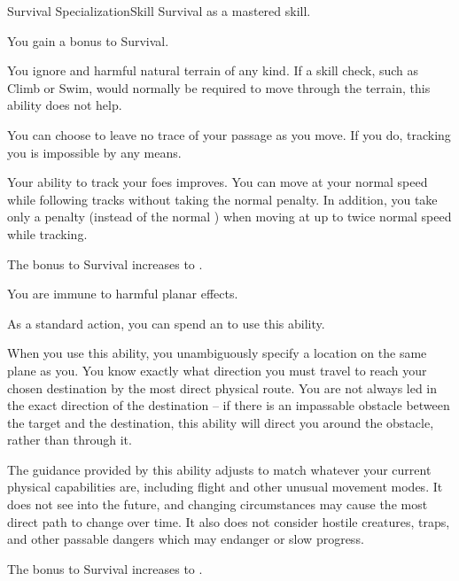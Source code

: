     \begin{feat}{Survival Specialization}{Skill}
        \featpre Survival as a mastered skill.
        \featben

         You gain a  bonus to Survival.

         You ignore  and harmful natural terrain of any kind.
        If a skill check, such as Climb or Swim, would normally be required to move through the terrain, this ability does not help.

         You can choose to leave no trace of your passage as you move.
        If you do, tracking you is impossible by any  means.

        Your ability to track your foes improves.
        You can move at your normal speed while following tracks without taking the normal  penalty.
        In addition, you take only a  penalty (instead of the normal ) when moving at up to twice normal speed while tracking.

         The bonus to Survival increases to .

         You are immune to harmful planar effects.

         As a standard action, you can spend an  to use this ability.
        \begin{ability}
            \begin{spelleffects}
                \spellspecial When you use this ability, you unambiguously specify a location on the same plane as you.
                \spelleffect You know exactly what direction you must travel to reach your chosen destination by the most direct physical route.
                You are not always led in the exact direction of the destination -- if there is an impassable obstacle between the target and the destination, this ability will direct you around the obstacle, rather than through it.

                The guidance provided by this ability adjusts to match whatever your current physical capabilities are, including flight and other unusual movement modes. It does not see into the future, and changing circumstances may cause the most direct path to change over time.
                It also does not consider hostile creatures, traps, and other passable dangers which may endanger or slow progress.
            \end{spelleffects}
        \end{ability}

         The bonus to Survival increases to .
    \end{feat}

